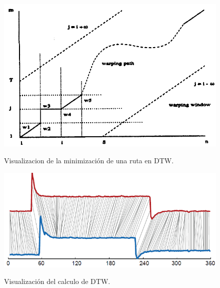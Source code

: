 \begin{figure}[h]
\vspace{0.1in}
\begin{center}
\includegraphics[scale=0.6]{dtw.png}\\
\end{center}
\caption{Visualizacion de la minimizaci\'on de una ruta en DTW.}
\label{arm:fig1}
\end{figure}
\begin{figure}[h]
\vspace{0.1in}
\begin{center}
\includegraphics[scale=0.6]{dtw2.png}\\
\end{center}
\caption{Visualizaci\'on del calculo de DTW.}
\label{arm:fig1}
\end{figure}
\clearpage